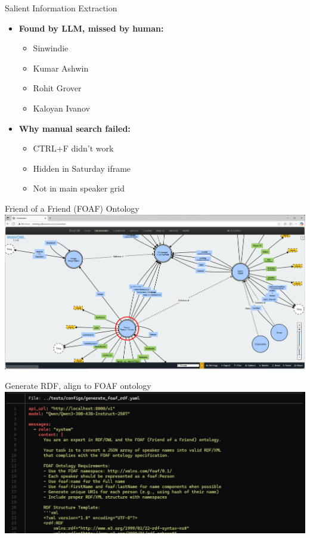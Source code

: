 \documentclass[pdf,aspectratio=169]{beamer}
\begin{document}
\begin{frame}{Salient Information Extraction}
  \begin{itemize}
  \item \textbf{Found by LLM, missed by human:}
    \begin{itemize}
    \item Sinwindie
    \item Kumar Ashwin
    \item Rohit Grover
    \item Kaloyan Ivanov
    \end{itemize}
  \item \textbf{Why manual search failed:}
    \begin{itemize}
    \item CTRL+F didn't work
    \item Hidden in Saturday iframe
    \item Not in main speaker grid
    \end{itemize}
  \end{itemize}
\end{frame}

\begin{frame}{Friend of a Friend (FOAF) Ontology}
  \centering
  \includegraphics[height=0.75\textheight]{foaf-person-webvowl.png} 
\end{frame}

\begin{frame}{Generate RDF, align to FOAF ontology}
  \centering
  \includegraphics[height=0.75\textheight]{generate_foaf_rdf.png}
\end{frame}
\end{document}
